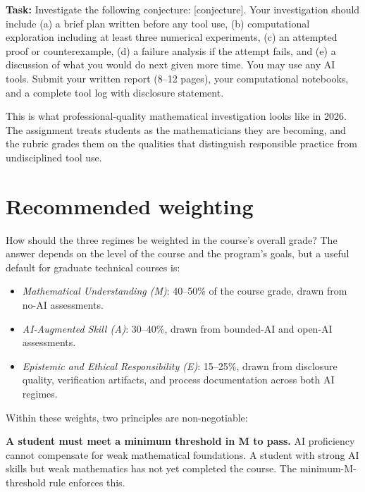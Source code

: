 \documentclass[11pt]{book}
\begin{document}
\begin{example}
\textbf{Task:} Investigate the following conjecture: [conjecture]. Your investigation should include (a) a brief plan written before any tool use, (b) computational exploration including at least three numerical experiments, (c) an attempted proof or counterexample, (d) a failure analysis if the attempt fails, and (e) a discussion of what you would do next given more time. You may use any AI tools. Submit your written report (8--12 pages), your computational notebooks, and a complete tool log with disclosure statement.

\medskip
This is what professional-quality mathematical investigation looks like in 2026. The assignment treats students as the mathematicians they are becoming, and the rubric grades them on the qualities that distinguish responsible practice from undisciplined tool use.
\end{example}

\section{Recommended weighting}

How should the three regimes be weighted in the course's overall grade? The answer depends on the level of the course and the program's goals, but a useful default for graduate technical courses is:

\begin{itemize}\setlength{\itemsep}{2pt}
\item \emph{Mathematical Understanding (M)}: 40--50\% of the course grade, drawn from no-AI assessments.
\item \emph{AI-Augmented Skill (A)}: 30--40\%, drawn from bounded-AI and open-AI assessments.
\item \emph{Epistemic and Ethical Responsibility (E)}: 15--25\%, drawn from disclosure quality, verification artifacts, and process documentation across both AI regimes.
\end{itemize}

Within these weights, two principles are non-negotiable:

\textbf{A student must meet a minimum threshold in M to pass.} AI proficiency cannot compensate for weak mathematical foundations. A student with strong AI skills but weak mathematics has not yet completed the course. The minimum-M-threshold rule enforces this.
\end{document}
